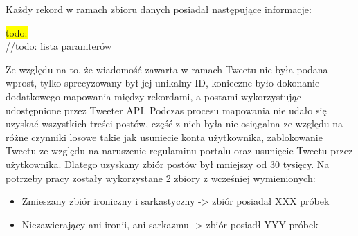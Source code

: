 Każdy rekord w ramach zbioru danych posiadał następujące informacje:

\colorbox{yellow}{todo:}\\

//todo: lista paramterów

Ze względu na to, że wiadomość zawarta w ramach Tweetu nie była podana wprost, tylko sprecyzowany był jej unikalny ID, konieczne było dokonanie dodatkowego mapowania między rekordami, a postami wykorzystując udostępnione przez Tweeter API. Podczas procesu mapowania nie udało się uzyskać wszystkich treści postów, część z nich była nie osiągalna ze względu na różne czynniki losowe takie jak usuniecie konta użytkownika, zablokowanie Tweetu ze względu na naruszenie regulaminu portalu oraz usunięcie Tweetu przez użytkownika. Dlatego uzyskany zbiór postów był mniejszy od 30 tysięcy.  
Na potrzeby pracy zostały wykorzystane 2 zbiory z wcześniej wymienionych:
\begin{itemize}
    \item Zmieszany zbiór ironiczny i sarkastyczny -> zbiór posiadał XXX próbek
    \item Niezawierający ani ironii, ani sarkazmu -> zbiór posiadł YYY próbek
\end{itemize}


